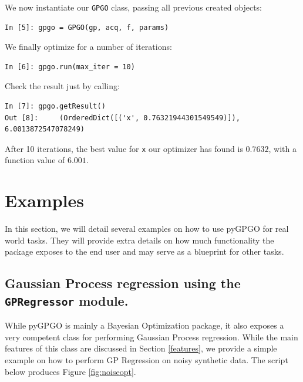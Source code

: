 \documentclass[10pt,a4paper,twoside]{book}
\begin{document}
We now instantiate our \texttt{GPGO} class, passing all previous created objects:

\begin{verbatim}
In [5]:	gpgo = GPGO(gp, acq, f, params)
\end{verbatim}

We finally optimize for a number of iterations:

\begin{verbatim}
In [6]: gpgo.run(max_iter = 10)               
\end{verbatim}

Check the result just by calling:

\begin{verbatim}
In [7]: gpgo.getResult()
Out [8]:	 (OrderedDict([('x', 0.76321944301549549)]), 6.0013872547078249)
\end{verbatim}

After 10 iterations, the best value for \texttt{x} our optimizer has found is $0.7632$, with a function value of $6.001$.

\section{Examples}

In this section, we will detail several examples on how to use pyGPGO for real world tasks. They will provide extra details on how much functionality the package exposes to the end user and may serve as a blueprint for other tasks.

\subsection{Gaussian Process regression using the \texttt{GPRegressor} module.}

While pyGPGO is mainly a Bayesian Optimization package, it also exposes a very competent class for performing Gaussian Process regression. While the main features of this class are discussed in Section \ref{features}, we provide a simple example on how to perform GP Regression on noisy synthetic data. The script below produces Figure \ref{fig:noiseopt}.
\end{document}
